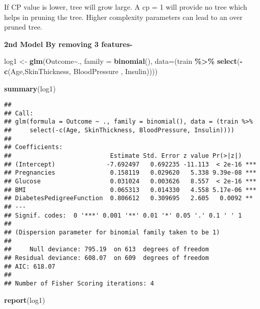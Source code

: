 \documentclass[
]{article}
\newenvironment{Shaded}{\begin{snugshade}}{\end{snugshade}}
\newcommand{\AttributeTok}[1]{\textcolor[rgb]{0.13,0.29,0.53}{#1}}
\newcommand{\FunctionTok}[1]{\textcolor[rgb]{0.13,0.29,0.53}{\textbf{#1}}}
\newcommand{\NormalTok}[1]{#1}
\newcommand{\OtherTok}[1]{\textcolor[rgb]{0.56,0.35,0.01}{#1}}
\newcommand{\SpecialCharTok}[1]{\textcolor[rgb]{0.81,0.36,0.00}{\textbf{#1}}}
\begin{document}
If CP value is lower, tree will grow large. A cp = 1 will provide no
tree which helps in pruning the tree. Higher complexity parameters can
lead to an over pruned tree.

\textbf{2nd Model By removing 3 features-}

\begin{Shaded}
\begin{Highlighting}[]
\NormalTok{log1 }\OtherTok{\textless{}{-}} \FunctionTok{glm}\NormalTok{(Outcome}\SpecialCharTok{\textasciitilde{}}\NormalTok{., }\AttributeTok{family =} \FunctionTok{binomial}\NormalTok{(), }\AttributeTok{data=}\NormalTok{(train }\SpecialCharTok{\%\textgreater{}\%} \FunctionTok{select}\NormalTok{(}\SpecialCharTok{{-}}\FunctionTok{c}\NormalTok{(Age,SkinThickness, }
\NormalTok{                BloodPressure ,                                         Insulin))))}

\FunctionTok{summary}\NormalTok{(log1)}
\end{Highlighting}
\end{Shaded}

\begin{verbatim}
## 
## Call:
## glm(formula = Outcome ~ ., family = binomial(), data = (train %>% 
##     select(-c(Age, SkinThickness, BloodPressure, Insulin))))
## 
## Coefficients:
##                           Estimate Std. Error z value Pr(>|z|)    
## (Intercept)              -7.692497   0.692235 -11.113  < 2e-16 ***
## Pregnancies               0.158119   0.029620   5.338 9.39e-08 ***
## Glucose                   0.031024   0.003626   8.557  < 2e-16 ***
## BMI                       0.065313   0.014330   4.558 5.17e-06 ***
## DiabetesPedigreeFunction  0.806612   0.309695   2.605   0.0092 ** 
## ---
## Signif. codes:  0 '***' 0.001 '**' 0.01 '*' 0.05 '.' 0.1 ' ' 1
## 
## (Dispersion parameter for binomial family taken to be 1)
## 
##     Null deviance: 795.19  on 613  degrees of freedom
## Residual deviance: 608.07  on 609  degrees of freedom
## AIC: 618.07
## 
## Number of Fisher Scoring iterations: 4
\end{verbatim}

\begin{Shaded}
\begin{Highlighting}[]
\FunctionTok{report}\NormalTok{(log1)}
\end{Highlighting}
\end{Shaded}
\end{document}
